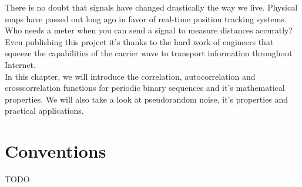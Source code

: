 There is no doubt that signals have changed drastically the way we live.
Physical maps have passed out long ago in favor of real-time position tracking
systems. Who needs a meter when you can send a signal to measure distances
accuratly? Even publishing this project it's thanks to the hard work of
engineers that squeeze the capabilities of the carrier wave to transport
information throughout Internet. \\

In this chapter, we will introduce the correlation, autocorrelation and
crosscorrelation functions for periodic binary sequences and it's mathematical
properties. We will also take a look at pseudorandom noise, it's properties and
practical applications.


\section{Conventions}
 TODO

 
